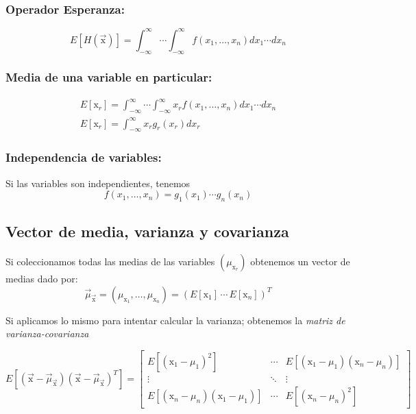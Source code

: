 \documentclass[openany]{book}
\begin{document}
\subsubsection*{Operador Esperanza:}
\begin{equation*}
  E\left[H(\vec{\mathrm{x}})\right]=\int_{-\infty}^{\infty}\cdots \int_{-\infty}^{\infty}f(x_1,\dots,x_{n})dx_{1}\cdots dx_{n}
\end{equation*}
\subsubsection*{Media de una variable en particular:}
\begin{gather*}
  E\left[\mathrm{x}_r\right]=\int_{-\infty}^{\infty}\cdots \int_{-\infty}^{\infty}x_{r}f(x_1,\dots,x_{n})dx_{1}\cdots dx_{n}\\
  E\left[\mathrm{x}_r\right]=\int_{-\infty}^{\infty}x_{r}g_{r}(x_{r})dx_{r}
\end{gather*}

\subsubsection*{Independencia de variables:}
Si las variables son independientes, tenemos
\begin{equation*}
  f(x_{1},\dots,x_{n})=g_{1}(x_{1})\cdots g_{n}(x_{n})
\end{equation*}

\subsection{Vector de media, varianza y covarianza}
Si coleccionamos todas las medias de las variables $(\mu_{\mathrm{x}_r})$ obtenemos un vector de medias dado por:
\begin{equation}
  \label{media-vec}
  \vec{\mu}_{\vec{\mathrm{x}}}=(\mu_{\mathrm{x}_1},\dots,\mu_{\mathrm{x}_n})=(E\left[\mathrm{x}_1\right]\,\cdots\,E\left[\mathrm{x}_n\right])^T
\end{equation}

\par Si aplicamos lo mismo para intentar calcular la varianza; obtenemos la \emph{matriz de varianza-covarianza}

\begin{equation*}
  E\left[(\vec{\mathrm{x}}-\vec{\mu}_{\vec{\mathrm{x}}})(\vec{\mathrm{x}}-\vec{\mu}_{\vec{\mathrm{x}}})^T\right]=\begin{bmatrix} E\left[(\mathrm{x_1}-\mu_1)^2\right] & \cdots & E\left[(\mathrm{x_1}-\mu_1)(\mathrm{x}_{n}-\mu_{n})\right]\\
    \vdots & \ddots & \vdots \\
  E\left[(\mathrm{x}_{n}-\mu_{n})(\mathrm{x_{1}}-\mu_{1})\right] & \cdots & E\left[(\mathrm{x}_{n}-\mu_{n})^2\right] \end{bmatrix}
\end{equation*}
\end{document}

